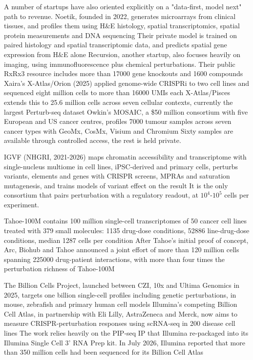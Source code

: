 A number of startups have also oriented explicitly on a "data-first, model next" path to revenue. Noetik, founded in 2022, generates microarrays from clinical tissues, and profiles them using H\&E histology, spatial transcriptomics, spatial protein measurements and DNA sequencing Their private model is trained on paired histology and spatial transcriptomic data, and predicts spatial gene expression from H\&E alone Recursion, another startup, also focuses heavily on imaging, using immunofluorescence plus chemical perturbations. Their public RxRx3 resource includes more than \num{17000} gene knockouts and \num{1600} compounds Xaira's X-Atlas/Orion (2025) applied genome-wide CRISPRi to two cell lines and sequenced eight million cells to more than \num{16000} UMIs each X-Atlas/Pisces extends this to 25.6 million cells across seven cellular contexts, currently the largest Perturb-seq dataset Owkin's MOSAIC, a \$50 million consortium with five European and US cancer centres, profiles \num{7000} tumour samples across seven cancer types with GeoMx, CosMx, Visium and Chromium Sixty samples are available through controlled access, the rest is held private.

IGVF (NHGRI, 2021-2026) maps chromatin accessibility and transcriptome with single-nucleus multiome in cell lines, iPSC-derived and primary cells, perturbs variants, elements and genes with CRISPR screens, MPRAs and saturation mutagenesis, and trains models of variant effect on the result It is the only consortium that pairs perturbation with a regulatory readout, at $10^4$-$10^5$ cells per experiment.

Tahoe-100M contains 100 million single-cell transcriptomes of 50 cancer cell lines treated with 379 small molecules: \num{1135} drug-dose conditions, \num{52886} line-drug-dose conditions, median \num{1287} cells per condition After Tahoe's initial proof of concept, Arc, Biohub and Tahoe announced a joint effort of more than 120 million cells spanning \num{225000} drug-patient interactions, with more than four times the perturbation richness of Tahoe-100M

The Billion Cells Project, launched between CZI, 10x and Ultima Genomics in 2025, targets one billion single-cell profiles including genetic perturbations, in mouse, zebrafish and primary human cell models Illumina's competing Billion Cell Atlas, in partnership with Eli Lilly, AstraZeneca and Merck, now aims to measure CRISPR-perturbation responses using scRNA-seq in 200 disease cell lines The work relies heavily on the PIP-seq IP that Illumina re-packaged into its Illumina Single Cell 3' RNA Prep kit. In July 2026, Illumina reported that more than 350 million cells had been sequenced for its Billion Cell Atlas

